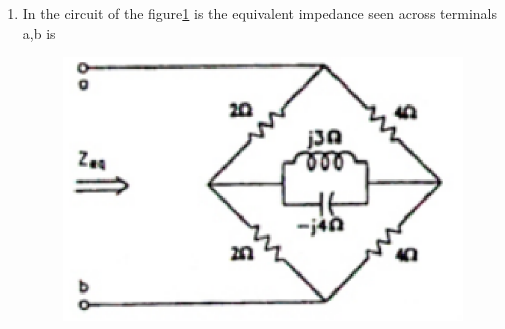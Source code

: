 \documentclass[journal,12pt,twocolumn]{IEEEtran}
\begin{document}
\begin{enumerate}
\item In the circuit of the figure\ref{fig16} is the equivalent impedance seen across terminals a,b is
\begin{enumerate}
\setlength\itemsep{2em}
\begin{figure}[!h]
\begin{center}
\includegraphics[scale=0.9]{./figs/fig16.eps}
\caption{}
\label{fig16}
\end{center}
\end{figure}
\end{enumerate}



\end{enumerate}
\end{document}
